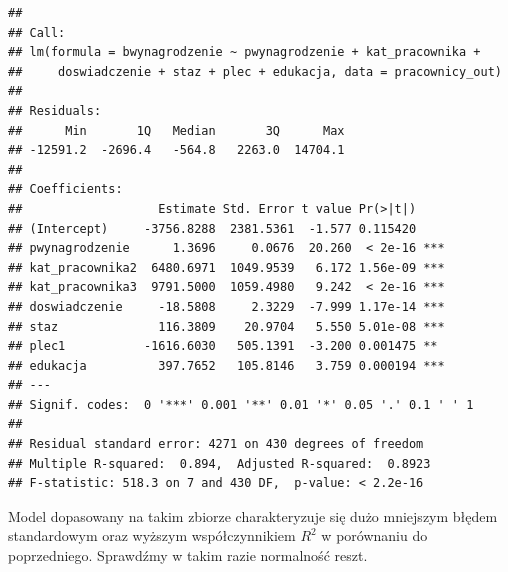 \documentclass[
]{book}
\newenvironment{Shaded}{\begin{snugshade}}{\end{snugshade}}
\newcommand{\DataTypeTok}[1]{\textcolor[rgb]{0.13,0.29,0.53}{#1}}
\newcommand{\KeywordTok}[1]{\textcolor[rgb]{0.13,0.29,0.53}{\textbf{#1}}}
\newcommand{\NormalTok}[1]{#1}
\newcommand{\OperatorTok}[1]{\textcolor[rgb]{0.81,0.36,0.00}{\textbf{#1}}}
\newcommand{\StringTok}[1]{\textcolor[rgb]{0.31,0.60,0.02}{#1}}
\begin{document}
\begin{Shaded}
\end{Shaded}

\begin{verbatim}
## 
## Call:
## lm(formula = bwynagrodzenie ~ pwynagrodzenie + kat_pracownika + 
##     doswiadczenie + staz + plec + edukacja, data = pracownicy_out)
## 
## Residuals:
##      Min       1Q   Median       3Q      Max 
## -12591.2  -2696.4   -564.8   2263.0  14704.1 
## 
## Coefficients:
##                   Estimate Std. Error t value Pr(>|t|)    
## (Intercept)     -3756.8288  2381.5361  -1.577 0.115420    
## pwynagrodzenie      1.3696     0.0676  20.260  < 2e-16 ***
## kat_pracownika2  6480.6971  1049.9539   6.172 1.56e-09 ***
## kat_pracownika3  9791.5000  1059.4980   9.242  < 2e-16 ***
## doswiadczenie     -18.5808     2.3229  -7.999 1.17e-14 ***
## staz              116.3809    20.9704   5.550 5.01e-08 ***
## plec1           -1616.6030   505.1391  -3.200 0.001475 ** 
## edukacja          397.7652   105.8146   3.759 0.000194 ***
## ---
## Signif. codes:  0 '***' 0.001 '**' 0.01 '*' 0.05 '.' 0.1 ' ' 1
## 
## Residual standard error: 4271 on 430 degrees of freedom
## Multiple R-squared:  0.894,  Adjusted R-squared:  0.8923 
## F-statistic: 518.3 on 7 and 430 DF,  p-value: < 2.2e-16
\end{verbatim}

Model dopasowany na takim zbiorze charakteryzuje się dużo mniejszym błędem standardowym oraz wyższym współczynnikiem \(R^2\) w porównaniu do poprzedniego. Sprawdźmy w takim razie normalność reszt.
\end{document}
